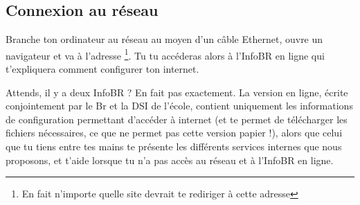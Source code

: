 
\subsection{Connexion au réseau}

Branche ton ordinateur au réseau au moyen d'un câble Ethernet, ouvre un navigateur et va à l'adresse \footnote{En fait n'importe quelle site devrait te rediriger à cette adresse}. Tu tu accéderas alors à l'InfoBR en ligne qui t'expliquera comment configurer ton internet.

Attends, il y a deux InfoBR ? En fait pas exactement. La version en ligne, écrite conjointement par le Br et la DSI de l'école,  contient uniquement les informations de configuration permettant d'accéder à internet (et te permet de télécharger les fichiers nécessaires, ce que ne permet pas cette version papier !), alors que celui que tu tiens entre tes mains te présente les différents services internes que nous proposons, et t'aide lorsque tu n'a pas accès au réseau et à l'InfoBR en ligne.
